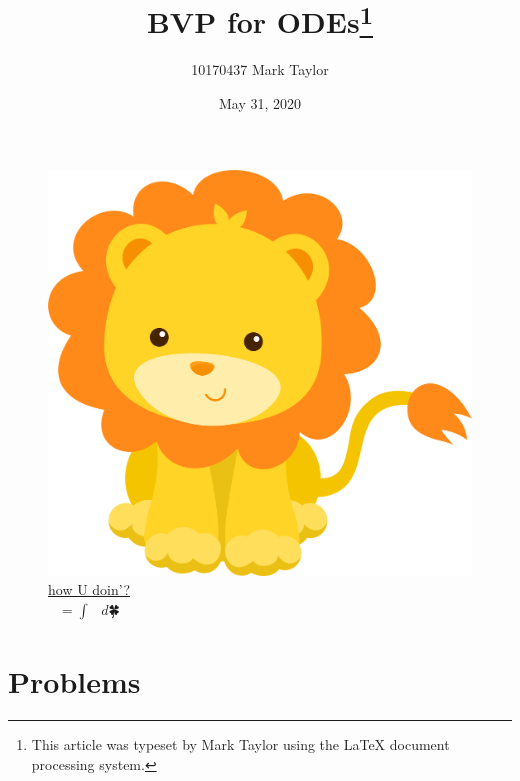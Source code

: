 \documentclass[a4paper,english]{article}
\begin{document}
	\thispagestyle{empty}
	\begin{figure}
		\centering
		\includegraphics[width=0.81\paperwidth]{img/lion.png}
		\caption*{\href{https://github.com/How-u-doing}{how U doin'?}
			\\ $🐊^{🐊^{🐊}} = ∫_{🎃}^{🎅} 🙊 \ d🍀$ }
		\label{cover:lion}
	\end{figure}
	\pagecolor{pink}
	\afterpage{\nopagecolor}
	\clearpage
	\newpage
	
	\title{BVP for ODEs\thanks{This article was typeset by Mark Taylor using 
	the \protect\LaTeX{}
			document processing system. }}
	
	\author{10170437 Mark Taylor}
	
	\date{May 31, 2020}
	
	\maketitle
	
	\hypertarget{Contents}{}  %
	\tableofcontents
	
	\section{Problems}
	
\end{document}

